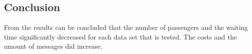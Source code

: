 \subsection{Conclusion}

From the results can be concluded that the number of passengers and the waiting time significantly decreased for each data set that is tested. The costs and the amount of messages did increase.
